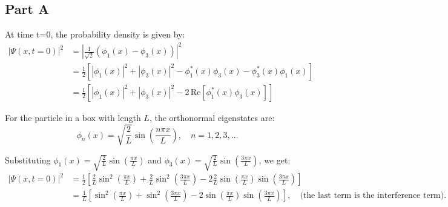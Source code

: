 \documentclass{article}
\begin{document}
\begin{adjustwidth}{5pt}{5pt}

\subsection*{Part A}
At time t=0, the probability density is given by:
\begin{align*}
  |\Psi(x, t = 0)|^2 &= \left| \frac{1}{\sqrt{2}} (\phi_1(x) - \phi_3(x)) \right|^2 \\
  &= \frac{1}{2} \left[ |\phi_1(x)|^2 + |\phi_3(x)|^2 - \phi_1^*(x) \phi_3(x) - \phi_3^*(x) \phi_1(x) \right] \\
  &= \frac{1}{2} \left[ |\phi_1(x)|^2 + |\phi_3(x)|^2 - 2 \, \text{Re}[\phi_1^*(x) \phi_3(x)] \right]
\end{align*}

\noindent For the particle in a box with length $L$, the orthonormal eigenstates are:
\[
\phi_n(x) = \sqrt{\frac{2}{L}} \sin \left( \frac{n \pi x}{L} \right), \quad n = 1, 2, 3, \dots
\]

\noindent Substituting $\phi_1(x) = \sqrt{\frac{2}{L}} \sin \left( \frac{\pi x}{L} \right)$ and $\phi_3(x) = \sqrt{\frac{2}{L}} \sin \left( \frac{3 \pi x}{L} \right)$, we get:
\begin{align*}
  |\Psi(x, t = 0)|^2 &= \frac{1}{2} \left[ \frac{2}{L} \sin^2 \left( \frac{\pi x}{L} \right) + \frac{2}{L} \sin^2 \left( \frac{3 \pi x}{L} \right) - 2 \frac{2}{L} \sin \left( \frac{\pi x}{L} \right) \sin \left( \frac{3 \pi x}{L} \right) \right] \\
  &= \frac{1}{L} \left[ \sin^2 \left( \frac{\pi x}{L} \right) + \sin^2 \left( \frac{3 \pi x}{L} \right) - 2 \sin \left( \frac{\pi x}{L} \right) \sin \left( \frac{3 \pi x}{L} \right) \right], \quad \text{(the last term is the interference term)}.
\end{align*}


\end{adjustwidth}
\end{document}
